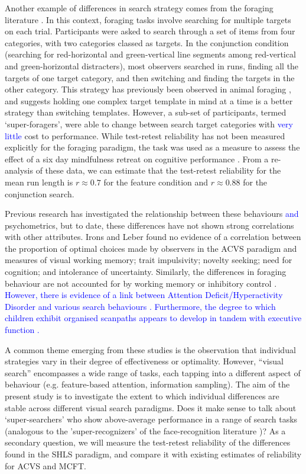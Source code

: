 \documentclass[Afour, sageapa, times]{sagej}
\begin{document}
Another example of differences in search strategy comes from the foraging literature  \cite{kristjansson2014,johannesson2016}. In this context, foraging tasks involve searching for multiple targets on each trial. Participants were asked to search through a set of items from four categories, with two categories classed as targets. In the conjunction condition (searching for red-horizontal and green-vertical line segments among red-vertical and green-horizontal distracters), most observers searched in runs, finding all the targets of one target category, and then switching and finding the targets in the other category. This strategy has previously been observed in animal foraging  \cite{dawkins1971}, and suggests holding one complex target template in mind at a time is a better strategy than switching templates. However, a sub-set of participants, termed `super-foragers', were able to change between search target categories with \textcolor{blue}{very little} cost to performance. While test-retest reliability has not been measured explicitly for the foraging paradigm, the task was used as a measure to assess the effect of a six day mindfulness retreat on cognitive performance \cite{hartkamp2017}. From a re-analysis of these data, we can estimate that the test-retest reliability for the mean run length is $r \approx 0.7$ for the feature condition and $r \approx 0.88$ for the conjunction search.  

Previous research has investigated the relationship between these behaviours \textcolor{blue}{and} psychometrics, but to date, these differences have not shown strong correlations with other attributes. Irons and Leber \citeyear{irons-leber2016,irons-leber2018} found no evidence of a correlation between the proportion of optimal choices made by observers in the ACVS paradigm and measures of visual working memory; trait impulsivity; novelty seeking; need for cognition; and intolerance of uncertainty. Similarly, the differences in foraging behaviour are not accounted for by working memory or inhibitory control \cite{johannesson2017}. \textcolor{blue}{However, there is evidence of a link between Attention Deficit/Hyperactivity Disorder and various search behaviours \cite{vandendriessche2019}. Furthermore, the degree to which children exhibit organised scanpaths appears to develop in tandem with executive function \cite{woods2013}.}

A common theme emerging from these studies is the observation that individual strategies vary in their degree of effectiveness or optimality. However, ``visual search'' encompasses a wide range of tasks, each tapping into a different aspect of behaviour (e.g. feature-based attention, information sampling). The aim of the present study is to investigate the extent to which individual differences are stable across different visual search paradigms. Does it make sense to talk about `super-searchers' who show above-average performance in a range of search tasks (analogous to the 'super-recognizers' of the face-recognition literature  \cite{russell2009})? As a secondary question, we will measure the test-retest reliability of the differences found in the SHLS paradigm, and compare it with existing estimates of reliability for ACVS and MCFT. 
\end{document}
